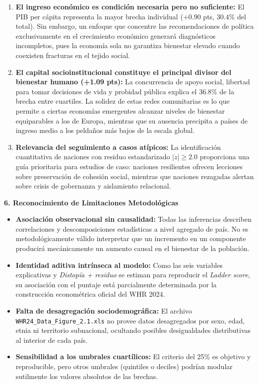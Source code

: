 \documentclass[9pt,a4paper]{article}
\newcommand{\customsection}[1]{%
  \vspace{0.2em}%
  {\small\bfseries\color{whrmagenta}#1}%
  \vspace{0.05em}\par%
}
\begin{document}
\begin{enumerate}[leftmargin=1.15em, itemsep=0.2em]
    \item \textbf{El ingreso económico es condición necesaria pero no suficiente:} El PIB per cápita representa la mayor brecha individual ($+0.90$ pts, $30.4\%$ del total). Sin embargo, un enfoque que concentre las recomendaciones de política exclusivamente en el crecimiento económico generará diagnósticos incompletos, pues la economía sola no garantiza bienestar elevado cuando coexisten fracturas en el tejido social.
    \item \textbf{El capital socioinstitucional constituye el principal divisor del bienestar humano (+1.09 pts):} La concurrencia de apoyo social, libertad para tomar decisiones de vida y probidad pública explica el $36.8\%$ de la brecha entre cuartiles. La solidez de estas redes comunitarias es lo que permite a ciertas economías emergentes alcanzar niveles de bienestar equiparables a los de Europa, mientras que su ausencia precipita a países de ingreso medio a los peldaños más bajos de la escala global.
    \item \textbf{Relevancia del seguimiento a casos atípicos:} La identificación cuantitativa de naciones con residuo estandarizado $|z| \ge 2.0$ proporciona una guía prioritaria para estudios de caso: naciones resilientes ofrecen lecciones sobre preservación de cohesión social, mientras que naciones rezagadas alertan sobre crisis de gobernanza y aislamiento relacional.
\end{enumerate}

\customsection{6. Reconocimiento de Limitaciones Metodológicas}
\begin{itemize}[leftmargin=1.1em, itemsep=0.1em]
    \item \textbf{Asociación observacional sin causalidad:} Todas las inferencias describen correlaciones y descomposiciones estadísticas a nivel agregado de país. No es metodológicamente válido interpretar que un incremento en un componente producirá mecánicamente un aumento causal en el bienestar de la población.
    \item \textbf{Identidad aditiva intrínseca al modelo:} Como las seis variables explicativas y \textit{Distopía + residuo} se estiman para reproducir el \textit{Ladder score}, su asociación con el puntaje está parcialmente determinada por la construcción econométrica oficial del WHR 2024.
    \item \textbf{Falta de desagregación sociodemográfica:} El archivo \texttt{WHR24\_Data\_Figure\_2.1.xls} no provee datos desagregados por sexo, edad, etnia ni territorio subnacional, ocultando posibles desigualdades distributivas al interior de cada país.
    \item \textbf{Sensibilidad a los umbrales cuartílicos:} El criterio del 25\% es objetivo y reproducible, pero otros umbrales (quintiles o deciles) podrían modular sutilmente los valores absolutos de las brechas.
\end{itemize}
\end{document}

